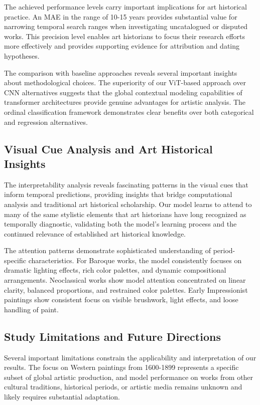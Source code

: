 \documentclass[10pt,twocolumn,letterpaper]{article}
\begin{document}
The achieved performance levels carry important implications for art historical practice. An MAE in the range of 10-15 years provides substantial value for narrowing temporal search ranges when investigating uncatalogued or disputed works. This precision level enables art historians to focus their research efforts more effectively and provides supporting evidence for attribution and dating hypotheses.

The comparison with baseline approaches reveals several important insights about methodological choices. The superiority of our ViT-based approach over CNN alternatives suggests that the global contextual modeling capabilities of transformer architectures \cite{Dosovitskiy20ViT} provide genuine advantages for artistic analysis. The ordinal classification framework \cite{Cao20Ordinal} demonstrates clear benefits over both categorical and regression alternatives.

\subsection{Visual Cue Analysis and Art Historical Insights}

The interpretability analysis reveals fascinating patterns in the visual cues that inform temporal predictions, providing insights that bridge computational analysis and traditional art historical scholarship. Our model learns to attend to many of the same stylistic elements that art historians have long recognized as temporally diagnostic, validating both the model's learning process and the continued relevance of established art historical knowledge.

The attention patterns demonstrate sophisticated understanding of period-specific characteristics. For Baroque works, the model consistently focuses on dramatic lighting effects, rich color palettes, and dynamic compositional arrangements. Neoclassical works show model attention concentrated on linear clarity, balanced proportions, and restrained color palettes. Early Impressionist paintings show consistent focus on visible brushwork, light effects, and loose handling of paint.

\subsection{Study Limitations and Future Directions}

Several important limitations constrain the applicability and interpretation of our results. The focus on Western paintings from 1600-1899 represents a specific subset of global artistic production, and model performance on works from other cultural traditions, historical periods, or artistic media remains unknown and likely requires substantial adaptation.
\end{document}
